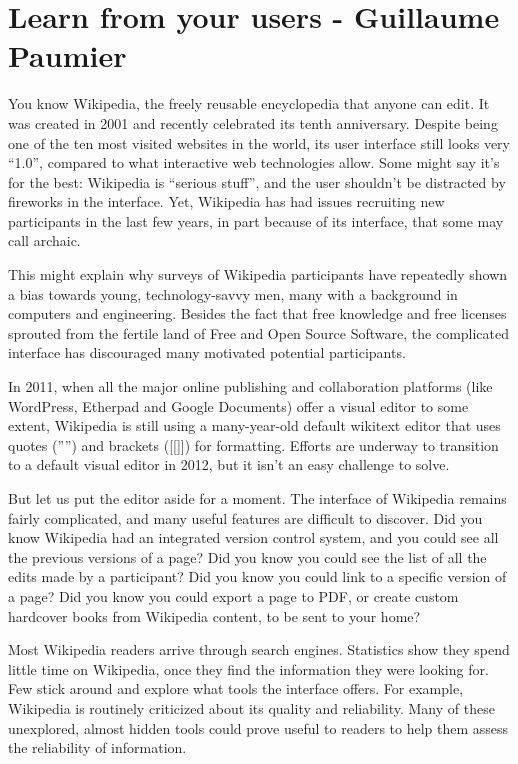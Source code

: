 \chapter{Learn from your users - Guillaume Paumier}
You know Wikipedia, the freely reusable encyclopedia that anyone can edit. It was created in 2001 and recently celebrated its tenth anniversary. Despite being one of the ten most visited websites in the world, its user interface still looks very ``1.0'', compared to what interactive web technologies allow. Some might say it's for the best: Wikipedia is ``serious stuff'', and the user shouldn't be distracted by fireworks in the interface. Yet, Wikipedia has had issues recruiting new participants in the last few years, in part because of its interface, that some may call archaic.

This might explain why surveys of Wikipedia participants have repeatedly shown a bias towards young, technology-savvy men, many with a background in computers and engineering. Besides the fact that free knowledge and free licenses sprouted from the fertile land of Free and Open Source Software, the complicated interface has discouraged many motivated potential participants.

In 2011, when all the major online publishing and collaboration platforms (like WordPress, Etherpad and Google Documents) offer a visual editor to some extent, Wikipedia is still using a many-year-old default wikitext editor that uses quotes ('''') and brackets ([[]]) for formatting. Efforts are underway to transition to a default visual editor in 2012, but it isn't an easy challenge to solve.

But let us put the editor aside for a moment. The interface of Wikipedia remains fairly complicated, and many useful features are difficult to discover. Did you know Wikipedia had an integrated version control system, and you could see all the previous versions of a page? Did you know you could see the list of all the edits made by a participant? Did you know you could link to a specific version of a page? Did you know you could export a page to PDF, or create custom hardcover books from Wikipedia content, to be sent to your home?

Most Wikipedia readers arrive through search engines. Statistics show they spend little time on Wikipedia, once they find the information they were looking for. Few stick around and explore what tools the interface offers. For example, Wikipedia is routinely criticized about its quality and reliability. Many of these unexplored, almost hidden tools could prove useful to readers to help them assess the reliability of information.

